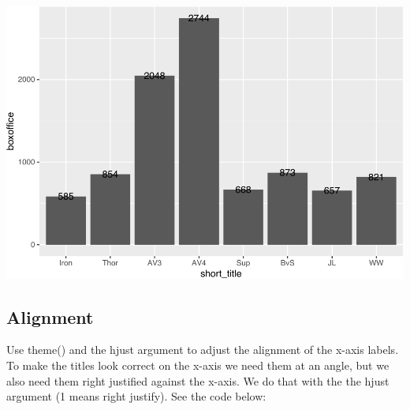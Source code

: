 \documentclass[
]{krantz}
\begin{document}
\includegraphics{bookdown_files/figure-latex/unnamed-chunk-254-1.pdf}

\hypertarget{alignment}{%
\subsection{Alignment}\label{alignment}}

Use theme() and the hjust argument to adjust the alignment of the x-axis labels. To make the titles look correct on the x-axis we need them at an angle, but we also need them right justified against the x-axis. We do that with the the hjust argument (1 means right justify). See the code below:
\end{document}
